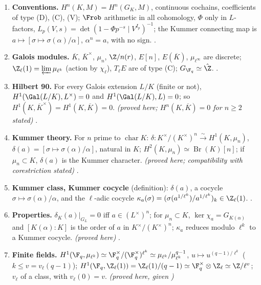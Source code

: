 \begin{sloppypar}
\begin{enumerate}[label=\textbf{\thechapter.\arabic*}]
\item \textbf{Conventions.} $H^n(K,M)=H^n(G_K,M)$, continuous cochains, coefficients of type (D), (C), (V); $\Frob$ arithmetic in all cohomology, $\Phi$ only in $L$-factors,
$L_p(V,s)=\det(1-\Phi p^{-s}\mid V^{I_p})^{-1}$; the Kummer connecting map is $a\mapsto[\sigma\mapsto\sigma(\alpha)/\alpha]$, $\alpha^n=a$, with no sign.
.
\item \textbf{Galois modules.} $\overline K$, $\overline K^\times$, $\mu_n$, $\Z/n(r)$, $E[n]$, $E(\overline K)$, $\mu_{\ell^\infty}$ are discrete; $\Z_\ell(1)=\varprojlim\mu_{\ell^k}$ (action by $\chi_\ell$),
$T_\ell E$ are of type (C); $G_{\F_q}\simeq\hat\Z$. .
\item \textbf{Hilbert 90.} For every Galois extension $L/K$ (finite or not), $H^1(\Gal(L/K),L^\times)=0$ and $H^1(\Gal(L/K),L)=0$; so $H^1(K,\overline K^\times)=H^1(K,\overline K)=0$.
\emph{(proved here; $H^n(K,\overline K)=0$ for $n\ge2$ stated)} .
\item \textbf{Kummer theory.} For $n$ prime to $\operatorname{char}K$: $\delta\colon K^\times/(K^\times)^n\xrightarrow{\sim}H^1(K,\mu_n)$, $\delta(a)=[\sigma\mapsto\sigma(\alpha)/\alpha]$, natural in $K$;
$H^2(K,\mu_n)\simeq\operatorname{Br}(K)[n]$; if $\mu_n\subset K$, $\delta(a)$ is the Kummer character. \emph{(proved here; compatibility with corestriction stated)} .
\item \textbf{Kummer class, Kummer cocycle} (definition): $\delta(a)$, a cocycle $\sigma\mapsto\sigma(\alpha)/\alpha$, and the $\ell$-adic cocycle $\kappa_a(\sigma)=(\sigma(a^{1/\ell^k})/a^{1/\ell^k})_k\in\Z_\ell(1)$.
.
\item \textbf{Properties.} $\delta_K(a)|_{G_L}=0$ iff $a\in(L^\times)^n$; for $\mu_n\subset K$, $\ker\chi_a=G_{K(\alpha)}$ and $[K(\alpha):K]$ is the order of $a$ in $K^\times/(K^\times)^n$; $\kappa_a$
reduces modulo $\ell^k$ to a Kummer cocycle. \emph{(proved here)} .
\item \textbf{Finite fields.} $H^1(\F_q,\mu_{\ell^k})\simeq\F_q^\times/(\F_q^\times)^{\ell^k}\simeq\mu_{\ell^k}/\mu_{\ell^k}^{q-1}$, $u\mapsto u^{(q-1)/\ell^k}$ ($k\le v=v_\ell(q-1)$);
$H^1(\F_q,\Z_\ell(1))=\Z_\ell(1)/(q-1)\simeq\F_q^\times\otimes\Z_\ell\simeq\Z/\ell^v$; $v_\ell$ of a class, with $v_\ell(0)=v$. \emph{(proved here, given )}

\end{enumerate}
\end{sloppypar}
